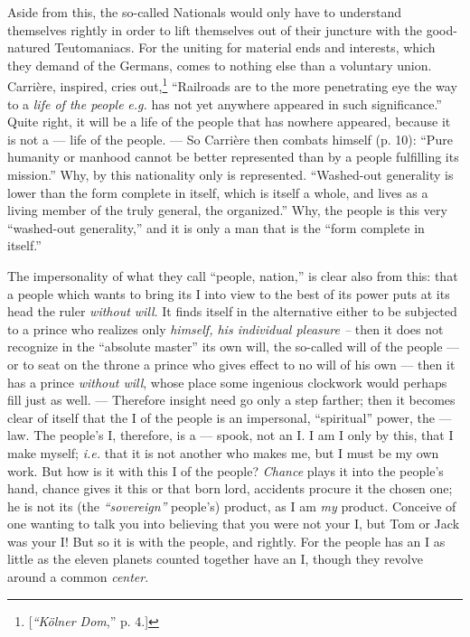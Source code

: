 Aside from this, the so-called Nationals would only have to understand 
themselves rightly in order to lift themselves out of their juncture with the 
good-natured Teutomaniacs. For the uniting for material ends and interests, 
which they demand of the Germans, comes to nothing else than a voluntary 
union. Carri\`ere, inspired, cries out,\footnote{[\textit{``K\"olner Dom},'' 
p. 4.]} ``Railroads are to the more penetrating eye the way to a \textit{life 
of the people} \textit{e.g.} has not yet anywhere appeared in such 
significance.'' Quite right, it will be a life of the people that has nowhere 
appeared, because it is not a --- life of the people. --- So Carri\`ere then 
combats himself (p. 10): ``Pure humanity or manhood cannot be better 
represented than by a people fulfilling its mission.'' Why, by this 
nationality only is represented. ``Washed-out generality is lower than the 
form complete in itself, which is itself a whole, and lives as a living member 
of the truly general, the organized.'' Why, the people is this very 
``washed-out generality,'' and it is only a man that is the ``form complete 
in itself.''

The impersonality of what they call ``people, nation,'' is clear also from 
this: that a people which wants to bring its I into view to the best of its 
power puts at its head the ruler \textit{without will}. It finds itself in the 
alternative either to be subjected to a prince who realizes only 
\textit{himself, his individual pleasure --} then it does not recognize in the 
``absolute master'' its own will, the so-called will of the people --- or to 
seat on the throne a prince who gives effect to no will of his own --- then it 
has a prince \textit{without will}, whose place some ingenious clockwork would 
perhaps fill just as well. --- Therefore insight need go only a step farther; 
then it becomes clear of itself that the I of the people is an impersonal, 
``spiritual'' power, the --- law. The people's I, therefore, is a --- spook, 
not an I. I am I only by this, that I make myself; \textit{i.e.} that it is 
not another who makes me, but I must be my own work. But how is it with this I 
of the people? \textit{Chance} plays it into the people's hand, chance gives 
it this or that born lord, accidents procure it the chosen one; he is not its 
(the \textit{``sovereign''} people's) product, as I am \textit{my} product. 
Conceive of one wanting to talk you into believing that you were not your I, 
but Tom or Jack was your I! But so it is with the people, and rightly. For the 
people has an I as little as the eleven planets counted together have an I, 
though they revolve around a common \textit{center}.

